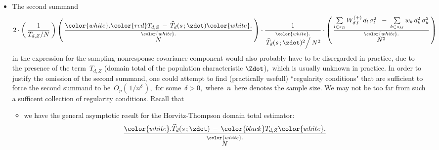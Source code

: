 \begin{itemize}
\begin{itemize}
        \vskip 0.3cm
    \item
        The second summand
        \begin{equation*}
        2
        \cdot
        \left(\,
            \dfrac{1}{T_{d,Z} \slash N}
            \,\right)
        \left(\,
            \dfrac{
                {\color{white}.}
                {\color{red}T_{d,Z}} \,-\, \widehat{T}_{d}(s\,;\zdot)
                {\color{white}.}
                }{
                \overset{{\color{white}.}}{
                    N
                    }
                }           
            \,\right)
        \cdot
        \dfrac{
            1
            }{
            \overset{{\color{white}.}}{
                \left. \widehat{T}_{d}(s\,;\zdot)^{2} \right\slash N^{2}
                }
            }
        \cdot
        \left(\,
            \dfrac{
                \underset{l \in s_{R}}{\sum}\,
                W^{(+)}_{d,l}\,d_{l}\,\sigma_{l}^{2}
                \;\;-\;
                \underset{k \in s_{M}}{\sum}\,
                w_{k}\,d_{k}^{2}\,\sigma_{k}^{2}
                }{
                \overset{{\color{white}.}}{N^{2}}                
                }
            \,\right)
        \end{equation*}
        in the expression for the sampling-nonresponse covariance component
        would also probably have to be disregarded in practice,
        due to the presence of the term \,$T_{d,Z}$
        (domain total of the population characteristic $\Zdot$),\,
        which is usually unknown in practice.
        \vskip 0.1cm
        In order to justify the omission of the second summand,
        one could attempt to find (practically usefull) ``regularity conditions"
        that are sufficient to force the second summand to be
        \,$O_{p}\!\left(\,1/n^{\delta}\,\right)$,\,
        for some \,$\delta > 0$,\,
        where \,$n$\, here denotes the sample size.
        We may not be too far from such a sufficent collection of regularity conditions.
        Recall that
        \begin{itemize}
        \item
            we have the general asymptotic result for the Horvitz-Thompson domain total estimator:
            \begin{equation*}
            \dfrac{
                {\color{white}.}
                \widehat{T}_{d}(s\,;\zdot) \,-\, {\color{black}T_{d,Z}}
                {\color{white}.}
                }{
                \overset{{\color{white}.}}{
                    N
                    }
                }

\end{equation*}
\end{itemize}
\end{itemize}
\end{itemize}

